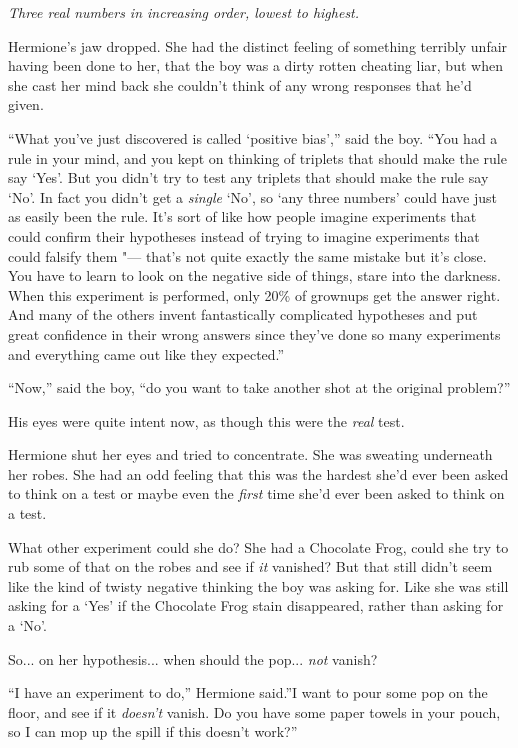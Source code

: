 \emph{Three real numbers in increasing order, lowest to highest.}

Hermione's jaw dropped. She had the distinct feeling of something
terribly unfair having been done to her, that the boy was a dirty rotten
cheating liar, but when she cast her mind back she couldn't think of any
wrong responses that he'd given.

``What you've just discovered is called `positive bias','' said the boy.
``You had a rule in your mind, and you kept on thinking of triplets that
should make the rule say `Yes'. But you didn't try to test any triplets
that should make the rule say `No'. In fact you didn't get a
\emph{single} `No', so `any three numbers' could have just as easily
been the rule. It's sort of like how people imagine experiments that
could confirm their hypotheses instead of trying to imagine experiments
that could falsify them "--- that's not quite exactly the same mistake but
it's close. You have to learn to look on the negative side of things,
stare into the darkness. When this experiment is performed, only 20\% of
grownups get the answer right. And many of the others invent
fantastically complicated hypotheses and put great confidence in their
wrong answers since they've done so many experiments and everything came
out like they expected.''

``Now,'' said the boy, ``do you want to take another shot at the
original problem?''

His eyes were quite intent now, as though this were the \emph{real}
test.

Hermione shut her eyes and tried to concentrate. She was sweating
underneath her robes. She had an odd feeling that this was the hardest
she'd ever been asked to think on a test or maybe even the \emph{first}
time she'd ever been asked to think on a test.

What other experiment could she do? She had a Chocolate Frog, could she
try to rub some of that on the robes and see if \emph{it} vanished? But
that still didn't seem like the kind of twisty negative thinking the boy
was asking for. Like she was still asking for a `Yes' if the Chocolate
Frog stain disappeared, rather than asking for a `No'.

So... on her hypothesis... when should the pop...
\emph{not} vanish?

``I have an experiment to do,'' Hermione said.''I want to pour some pop
on the floor, and see if it \emph{doesn't} vanish. Do you have some
paper towels in your pouch, so I can mop up the spill if this doesn't
work?''

